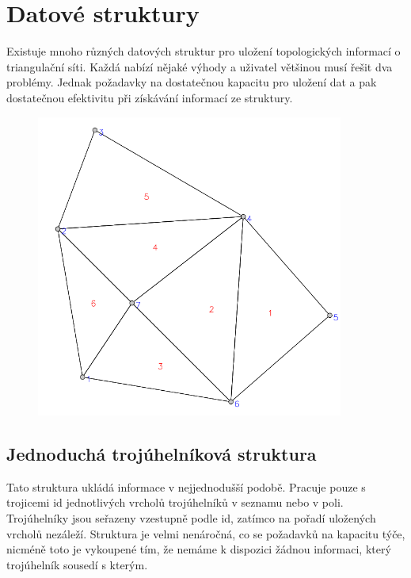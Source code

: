 \documentclass[12pt,a4paper]{article}
\begin{document}
\newpage
\section{Datové struktury}\label{sec:data_struct}

Existuje mnoho různých datových struktur pro uložení topologických informací o triangulační síti. Každá nabízí nějaké výhody a uživatel většinou musí řešit dva problémy. Jednak požadavky na dostatečnou kapacitu pro uložení dat a pak dostatečnou efektivitu při získávání informací ze struktury.

\begin{figure}[h!]
\centering
\includegraphics[width=0.9\textwidth]{../img/struct_triangulace.png}
\label{fig:struct_triangulace}
\end{figure}

\newpage
\subsection{Jednoduchá trojúhelníková struktura}
Tato struktura ukládá informace v nejjednodušší podobě. Pracuje pouze s trojicemi id jednotlivých vrcholů trojúhelníků v seznamu nebo v poli. Trojúhelníky jsou seřazeny vzestupně podle id, zatímco na pořadí uložených vrcholů nezáleží. Struktura je velmi nenáročná, co se požadavků na kapacitu týče, nicméně toto je vykoupené tím, že nemáme k dispozici žádnou informaci, který trojúhelník sousedí s kterým.
\end{document}
